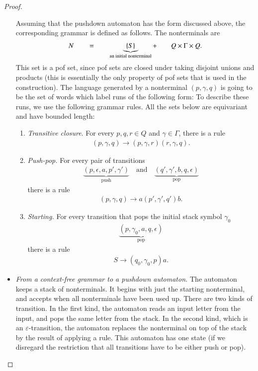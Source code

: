 \begin{proof}
\begin{itemize}
		Assuming that the pushdown automaton has the form discussed above, the corresponding grammar is defined as follows. The nonterminals   are 
	  \begin{align*}
		   N \qquad  =  \qquad \underbrace{\{S\}}_{\text{an initial nonterminal}} + \qquad  Q \times \Gamma \times Q.
	  \end{align*}
	  This set is a pof set, since pof sets are closed under taking disjoint unions and products (this is  essentially the only property of pof sets that is used in the construction).
	The language generated by a nonterminal $(p,\gamma,q)$ is going to be the set of words which label runs of the following form:
		To describe these runs, we use the following grammar rules. All  the sets  below are equivariant and have bounded length: 
	 \begin{enumerate}
		 \item \emph{Transitive closure}. For every  $p,q,r \in Q$ and $\gamma \in \Gamma$, there is a rule
		 \begin{align*}
			 (p,\gamma,q) \to (p,\gamma,r)(r,\gamma,q).
		 \end{align*}
		 \item \emph{Push-pop.} For every pair of transitions
		 \begin{align*}
			 \underbrace{(p,\epsilon, a, p', \gamma')}_{\text{push}} \quad \text{and} \quad 
			  \underbrace{(q',\gamma', b, q, \epsilon)}_{\text{pop}}
		 \end{align*}
		 there is  a rule
		 \begin{align*}
			 (p,\gamma,q) \to a (p',\gamma',q') b.
		 \end{align*}
		 \item \emph{Starting.}  For every transition that pops the initial stack symbol $\gamma_0$
		   \begin{align*}
			\underbrace{(p,\gamma_0, a, q, \epsilon)}_{\text{pop}}
		\end{align*} there is a rule 
		 \begin{align*}
			 S \to (q_0,\gamma_0,p) a .
		 \end{align*}
	 \end{enumerate} 
	  	\item  \emph{From a context-free grammar to a pushdown automaton.}  The automaton keeps a stack of nonterminals. It begins with just the starting nonterminal, and accepts when all nonterminals have been used up. There are two kinds of transition. In the first kind, the automaton reads an input letter from the input, and pops the same letter from the stack. In the second kind, which is an $\varepsilon$-transition, the automaton replaces the nonterminal on top of the stack by the result of applying a rule. This automaton has one state (if we disregard the restriction that all transitions have to be either push or pop). 

\end{itemize}
\end{proof}
